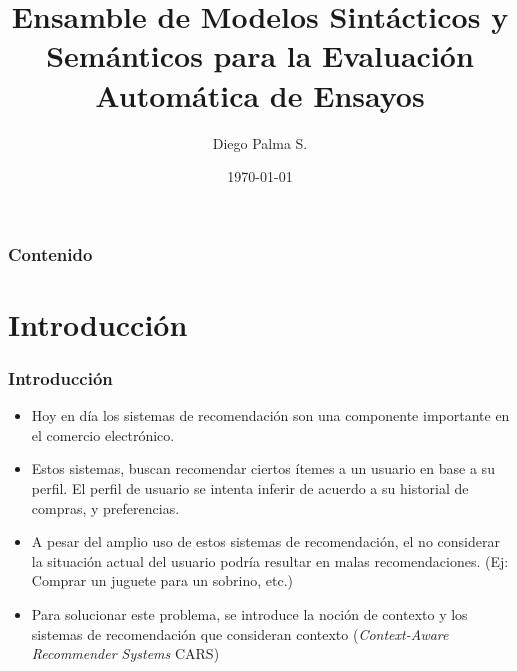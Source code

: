 \documentclass{beamer}
\title[Propuesta de Tesis De Magíster]{Ensamble de Modelos Sintácticos y Semánticos para la Evaluación Automática de Ensayos} %
\author{Diego Palma S.} %
\institute[UDEC] %
{
Profesor Supervisor: John Atkinson \\
\medskip
Universidad de Concepción \\ %
\medskip
\textit{dipalma@udec.cl} %
}
\date{\today} %
\begin{document}
\begin{frame}
\titlepage %
\end{frame}

\begin{frame}
\frametitle{Contenido} %
\tableofcontents %
\end{frame}


\section{Introducción} %

\begin{frame}
\frametitle{Introducción}
\begin{itemize}
\item Hoy en día los sistemas de recomendación son una componente importante en el comercio electrónico.
\item Estos sistemas, buscan recomendar ciertos ítemes a un usuario en base a su perfil. El perfil de usuario se intenta inferir de acuerdo a su historial de compras, y preferencias.
\item A pesar del amplio uso de estos sistemas de recomendación, el no considerar la situación actual del usuario podría resultar en malas recomendaciones. (Ej: Comprar un juguete para un sobrino, etc.)
\item Para solucionar este problema, se introduce la noción de contexto y los sistemas de recomendación que consideran contexto ({\em Context-Aware Recommender Systems} CARS)
\end{itemize}
\end{frame}
\end{document}
